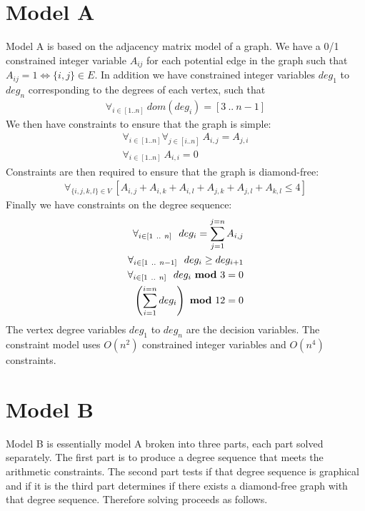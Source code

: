 \documentclass{l4proj}
\begin{document}
\section{Model A}
\vspace{-3mm}
Model A is based on the adjacency matrix model of a graph.
We have a 0/1 constrained integer variable $A_{ij}$ for each potential edge in the graph such that 
$A_{ij} = 1 \iff \{i,j\} \in E$.
In addition we have constrained integer variables $deg_1$ to $deg_n$ corresponding to the
degrees of each vertex, such that
\begin{eqnarray}
\forall_{i \in [1..n]} ~ dom(deg_{i}) = [3~..~n-1]
\end{eqnarray}
We then have constraints to ensure that the graph is simple:
\begin{eqnarray}
\forall_{i \in [1..n]} \forall_{j \in [i .. n]} ~ A_{i,j} = A_{j,i} \\
\forall_{i \in [1..n]} ~ A_{i,i} = 0
\end{eqnarray}
Constraints are then required to ensure that the graph is diamond-free:
\begin{eqnarray}
\forall_{\{i,j,k,l\} \in V}~[A_{i,j} + A_{i,k} + A_{i,l} + A_{j,k} + A_{j,l} + A_{k,l} \leq 4]
\end{eqnarray}
Finally we have constraints on the degree sequence:
\begin{eqnarray}
\forall_{i \in [1~..~n]}~~deg_i = \sum_{j=1}^{j=n}A_{i,j}\\
\forall_{i \in [1~..~n-1]}~~deg_i \geq deg_{i+1} \\
\forall_{i \in [1~..~n]} ~~ deg_{i}~{\bf mod}~3 = 0 \\
\left({\sum_{i=1}^{i=n} deg_{i}}\right) ~{\bf mod}~12 = 0
\end{eqnarray}
The vertex degree variables $deg_1$ to $deg_n$ are the decision variables. The constraint model uses 
$O(n^{2})$ constrained integer variables and $O(n^{4})$ constraints.

\section{Model B}
\vspace{-3mm}
Model B is essentially model A broken into three parts, each part solved separately. The first part
is to produce a degree sequence that meets the arithmetic constraints. The second
part tests if that degree sequence is graphical and if it is the third part
determines if there exists a diamond-free graph with that degree sequence. Therefore solving proceeds
as follows.
\end{document}
